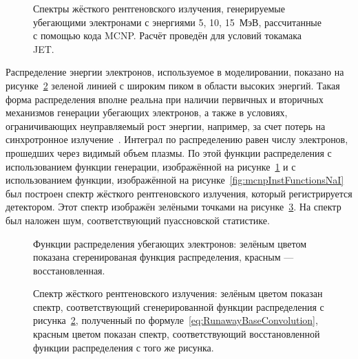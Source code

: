 \begin{figure}[ht!]
  \caption{ Спектры жёсткого рентгеновского излучения, генерируемые убегающими электронами с энергиями 5, 10, 15~МэВ, рассчитанные с помощью кода MCNP. Расчёт проведён для условий токамака JET.~\cite{Shevelev2013} }
  \label{fig:mcnpRunawayResponseJetSh2013}
\end{figure}

Распределение энергии электронов, используемое в моделировании, показано на рисунке~\ref{fig:runawayJetSimulationEdfSh2013} зеленой линией с широким пиком в области высоких энергий. Такая форма распределения вполне реальна при наличии первичных и вторичных механизмов генерации убегающих электронов, а также в условиях, ограничивающих неуправляемый рост энергии, например, за счет потерь на синхротронное излучение~\cite{MartinSolis1999,Shevelev2013}. Интеграл по  распределению равен числу электронов, прошедших через видимый объем плазмы. По этой функции распределения с использованием функции генерации, изображённой на рисунке~\ref{fig:mcnpRunawayResponseJetSh2013} и с использованием функции, изображённой на рисунке~\ref{fig:mcnpInstFunctionsNaI} был построен спектр жёсткого рентгеновского излучения, который регистрируется детектором. Этот спектр изображён зелёными точками на рисунке~\ref{fig:runawayJetSimulationSpectrumSh2013}. На спектр был наложен шум, соответствующий пуассновской статистике.~\cite{Shevelev2013}

\begin{figure}[ht!]
  \caption{ Функции распределения убегающих электронов: зелёным цветом показана сгеренированая функция распределения, красным --- восстановленная.~\cite{Shevelev2013} }
  \label{fig:runawayJetSimulationEdfSh2013}
\end{figure}

\begin{figure}[ht!]
  \caption{ Спектр жёсткого рентгеновского излучения: зелёным цветом показан спектр, соответствующий сгенерированной функции распределения с рисунка~\ref{fig:runawayJetSimulationEdfSh2013}, полученный по формуле~\ref{eq:RunawayBaseConvolution}, красным цветом показан спектр, соответствующий восстановленной функции распределения с того же рисунка.~\cite{Shevelev2013} }
  \label{fig:runawayJetSimulationSpectrumSh2013}
\end{figure}


